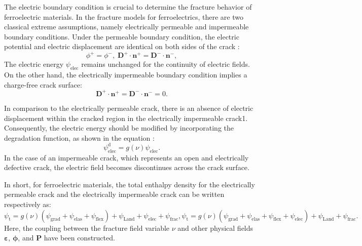 The electric boundary condition is crucial to determine the fracture behavior of ferroelectric materials. In the fracture models for ferroelectrics, there are two classical extreme assumptions, namely electrically permeable and impermeable boundary conditions. Under the permeable boundary condition, the electric potential and electric displacement are identical on both sides of the crack \cite{parton_fracture_1976}:
\begin{equation}
    \phi^+=\phi^-,\; \mathbf{D}^+\cdot\mathbf{n}^+=\mathbf{D}^-\cdot\mathbf{n}^-,
\end{equation}
The electric energy $\psi_{\mathrm{elec}}$ remains unchanged for the continuity of electric fields. On the other hand, the electrically impermeable boundary condition implies a charge-free crack surface:
\begin{equation}
    \mathbf{D}^+\cdot\mathbf{n}^+=\mathbf{D}^-\cdot\mathbf{n}^-=0.
\end{equation}

In comparison to the electrically permeable crack, there is an absence of electric displacement within the cracked region in the electrically impermeable crack1. Consequently, the electric energy should be modified by  incorporating the degradation function, as shown in the equation \cite{wang_effect_2010}:
\begin{equation}
    \psi_{\mathrm{elec}}^\mathrm{d}=g(\nu)\psi_{\mathrm{elec}}.
\end{equation}
In the case of an impermeable crack, which represents an open and electrically defective crack, the electric field becomes discontinues across the crack surface.

In short, for ferroelectric materials, the total enthalpy density for the electrically permeable crack and the electrically impermeable crack can be written respectively as:
\begin{subequations}
    \begin{equation}
        \psi_\mathrm{t}=g(\nu)\left( \psi_\mathrm{grad}+\psi_\mathrm{elas}+\psi_\mathrm{flex} \right)+\psi_\mathrm{Land}+\psi_\mathrm{elec}+\psi_\mathrm{frac},
    \end{equation}
    \begin{equation}
        \psi_\mathrm{t}=g(\nu)\left( \psi_\mathrm{grad}+\psi_\mathrm{elas}+\psi_\mathrm{flex}+\psi_\mathrm{elec} \right)+\psi_\mathrm{Land}+\psi_\mathrm{frac}.
    \end{equation}
\end{subequations}
Here, the coupling between the fracture field variable $\nu$ and other physical fields $\mathbf{\varepsilon}$, $\mathbf{\phi}$, and $\mathbf{P}$ have been constructed. 

